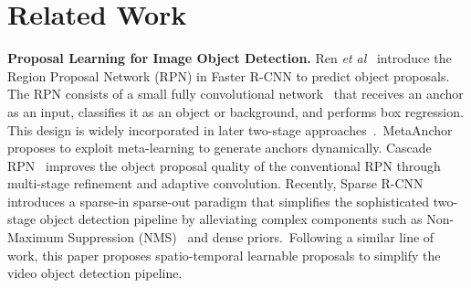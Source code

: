 \documentclass{bmvc2k}
\def\etal{\emph{et al}\bmvaOneDot}
\begin{document}
\section{Related Work}
\label{sec:related_work}

\noindent \textbf{Proposal Learning for Image Object Detection.}
\hspace{0.8pt}
\label{subsec:image_object_detection} 
Ren \etal~\cite{ren2015faster} introduce the Region Proposal Network (RPN) in Faster R-CNN to predict object proposals. The RPN consists of a small fully convolutional network~\cite{long2015fully} that receives an anchor as an input, classifies it as an object or background, and performs box regression. This design is widely incorporated in later two-stage approaches~\cite{dai2016r, he2017mask, lin2017feature, cai2018cascade}.~MetaAnchor~\cite{yang2018metaanchor} proposes to exploit meta-learning to generate anchors dynamically. Cascade RPN~\cite{vu2019cascade} improves the object proposal quality of the conventional RPN through multi-stage refinement and adaptive convolution. Recently, Sparse R-CNN~\cite{sun2021sparse} introduces a sparse-in sparse-out paradigm that simplifies the sophisticated two-stage object detection pipeline by alleviating complex components such as Non-Maximum Suppression (NMS)~\cite{neubeck2006efficient} and dense priors.~Following a similar line of work, this paper proposes spatio-temporal learnable proposals to simplify the video object detection pipeline.
 
\end{document}
